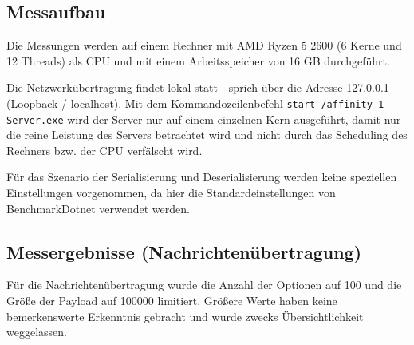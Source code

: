 \subsection{Messaufbau}
\label{subsec:messaufbau}

Die Messungen werden auf einem Rechner mit AMD Ryzen 5 2600 (6 Kerne und 12 Threads) als CPU und mit einem Arbeitsspeicher von 16 GB durchgeführt.

Die Netzwerkübertragung findet lokal statt - sprich über die Adresse 127.0.0.1 (Loopback / localhost). Mit dem Kommandozeilenbefehl \texttt{start /affinity 1 Server.exe} wird der Server nur auf einem einzelnen Kern ausgeführt, damit nur die reine Leistung des Servers betrachtet wird und nicht durch das Scheduling des Rechners bzw. der CPU verfälscht wird.

Für das Szenario der Serialisierung und Deserialisierung werden keine speziellen Einstellungen vorgenommen, da hier die Standardeinstellungen von BenchmarkDotnet verwendet werden.

\subsection{Messergebnisse (Nachrichtenübertragung)}
\label{subsec:messergebnisse-nachrichtenuebertragung}

Für die Nachrichtenübertragung wurde die Anzahl der Optionen auf 100 und die Größe der Payload auf 100000 limitiert. Größere Werte haben keine bemerkenswerte Erkenntnis gebracht und wurde zwecks Übersichtlichkeit weggelassen.

\begin{table}[h]
    \caption{Asynchrone Übertragung mit 100 Options und mit einer Payload von 100 Bytes.}
    \label{tab:asynchrone-uebertragung-100-100}
\end{table}

